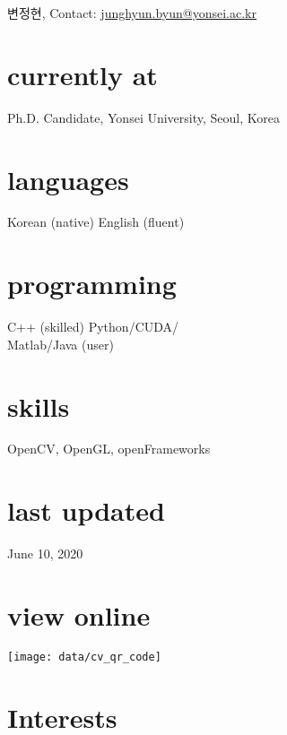 \documentclass[]{friggeri-cv}
\begin{document}
       { 변정현, Contact:
       \href{mailto:junghyun.byun@yonsei.ac.kr}{junghyun.byun@yonsei.ac.kr}}

\begin{aside}
  \section{currently at}
    Ph.D. Candidate, Yonsei University, Seoul, Korea
  \section{languages}
    Korean (native)
    English (fluent)
  \section{programming}
    C++ (skilled)
    Python/CUDA/\\Matlab/Java (user)
  \section{skills}
    OpenCV, OpenGL, openFrameworks
  \section{last updated}
    June 10, 2020
  \section{view online}
    \texttt{[image: data/cv\_qr\_code]}
\end{aside}


\section{Interests}
\end{document}
